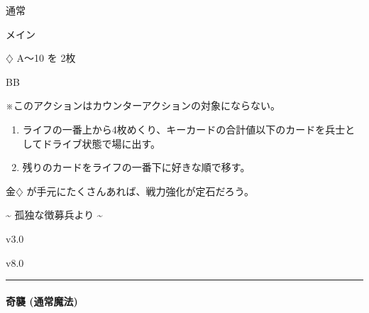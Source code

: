 \documentclass[letterpaper,10pt,dvipdfmx]{sphinxmanual}
\begin{document}
\sphinxAtStartPar
{} 通常

\sphinxAtStartPar
{} メイン

\sphinxAtStartPar
{} {\normalsize $\diamondsuit$} A〜10 を 2枚

\sphinxAtStartPar
{} BB

\sphinxAtStartPar
{} ※このアクションはカウンターアクションの対象にならない。

\sphinxAtStartPar
{}
\begin{enumerate}
%
\item {} 
\sphinxAtStartPar
ライフの一番上から4枚めくり、キーカードの合計値以下のカードを兵士としてドライブ状態で場に出す。

\item {} 
\sphinxAtStartPar
残りのカードをライフの一番下に好きな順で移す。

\end{enumerate}

\sphinxAtStartPar
{}

\sphinxAtStartPar
金{\normalsize $\diamondsuit$} が手元にたくさんあれば、戦力強化が定石だろう。

\sphinxAtStartPar
{}

\sphinxAtStartPar
{}

\sphinxAtStartPar
\textasciitilde{} 孤独な徴募兵より \textasciitilde{}

\sphinxAtStartPar
{}  v3.0

\sphinxAtStartPar
{}  v8.0


\bigskip\hrule\bigskip



\paragraph{奇襲 (通常魔法)}
\label{\detokenize{auto/actionlist:act-surprise}}\label{\detokenize{auto/actionlist:id41}}
\sphinxAtStartPar
{}
\end{document}
